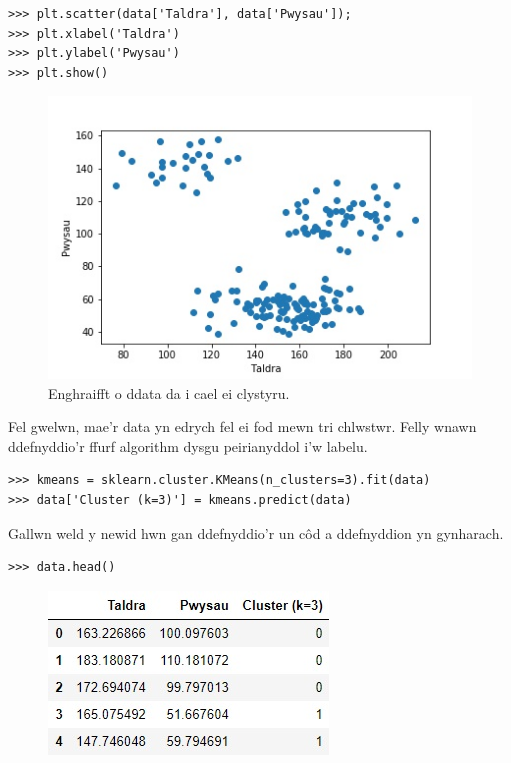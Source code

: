 \begin{verbatim}
>>> plt.scatter(data['Taldra'], data['Pwysau']);
>>> plt.xlabel('Taldra')
>>> plt.ylabel('Pwysau')
>>> plt.show()
\end{verbatim}

\begin{figure}[H]
\begin{center}
\includegraphics[width=0.7\linewidth]{../img/Scatterpython.jpeg}
\end{center}
\caption{Enghraifft o ddata da i cael ei clystyru.}
\label{fig:Scatterpython}
\end{figure}

Fel gwelwn, mae'r data yn edrych fel ei fod mewn tri chlwstwr. Felly wnawn ddefnyddio'r ffurf algorithm dysgu peirianyddol i'w labelu.

\begin{verbatim}
>>> kmeans = sklearn.cluster.KMeans(n_clusters=3).fit(data)
>>> data['Cluster (k=3)'] = kmeans.predict(data)
\end{verbatim}

Gallwn weld y newid hwn gan ddefnyddio'r un c\^{o}d a ddefnyddion yn gynharach.

\begin{verbatim}
>>> data.head()
\end{verbatim}

\begin{figure}[H]
\begin{center}
\includegraphics[width=0.35\linewidth]{../img/tabl2.jpg}
\end{center}
\label{fig:Data2}
\end{figure}


